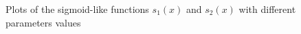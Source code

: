 \begin{figure}[!htp]
	\hfill
	
	\caption{Plots of the sigmoid-like functions $s_1(x)$ and $s_2(x)$ with different parameters values}
	\label{fig:chart}
\end{figure}


